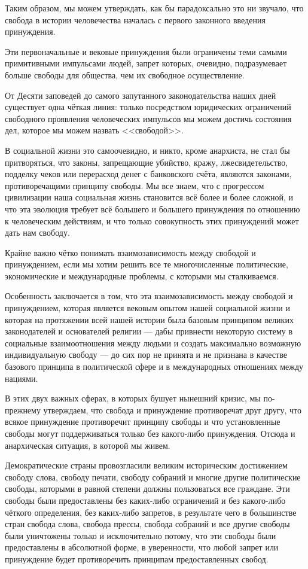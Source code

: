 Таким образом, мы можем утверждать, как бы парадоксально это ни звучало, что свобода в истории человечества началась с первого законного введения принуждения.
 
Эти первоначальные и вековые принуждения были ограничены теми самыми примитивными импульсами людей, запрет которых, очевидно, подразумевает больше свободы для общества, чем их свободное осуществление.

От Десяти заповедей до самого запутанного законодательства наших дней существует одна чёткая линия: только посредством юридических ограничений свободного проявления человеческих импульсов мы можем достичь состояния дел, которое мы можем назвать <<свободой>>.
 
В социальной жизни это самоочевидно, и никто, кроме анархиста, не стал бы притворяться, что законы, запрещающие убийство, кражу, лжесвидетельство, подделку чеков или перерасход денег с банковского счёта, являются законами, противоречащими принципу свободы. Мы все знаем, что с прогрессом цивилизации наша социальная жизнь становится всё более и более сложной, и что эта эволюция требует всё большего и большего принуждения по отношению к человеческим действиям, и что только совокупность этих принуждений может дать нам свободу.

Крайне важно чётко понимать взаимозависимость между свободой и принуждением, если мы хотим решить все те многочисленные политические, экономические и международные проблемы, с которыми мы сталкиваемся.

Особенность заключается в том, что эта взаимозависимость между свободой и принуждением, которая является вековым опытом нашей социальной жизни и которая на протяжении всей нашей истории была базовым принципом великих законодателей и основателей религии — дабы привнести некоторую систему в социальные взаимоотношения между людьми и создать максимально возможную индивидуальную свободу — до сих пор не принята и не признана в качестве базового принципа в политической сфере и в международных отношениях между нациями.

В этих двух важных сферах, в которых бушует нынешний кризис, мы по-прежнему утверждаем, что свобода и принуждение противоречат друг другу, что всякое принуждение противоречит принципу свободы и что установленные свободы могут поддерживаться только без какого-либо принуждения. Отсюда и анархическая ситуация, в которой мы живем.

Демократические страны провозгласили великим историческим достижением свободу слова, свободу печати, свободу собраний и многие другие политические свободы, которыми в равной степени должны пользоваться все граждане. Эти свободы были предоставлены без каких-либо ограничений и без какого-либо чёткого определения, без каких-либо запретов, в результате чего в большинстве стран свобода слова, свобода прессы, свобода собраний и все другие свободы были уничтожены только и исключительно потому, что эти свободы были предоставлены в абсолютной форме, в уверенности, что любой запрет или принуждение будет противоречить принципам предоставленных свобод.
 
